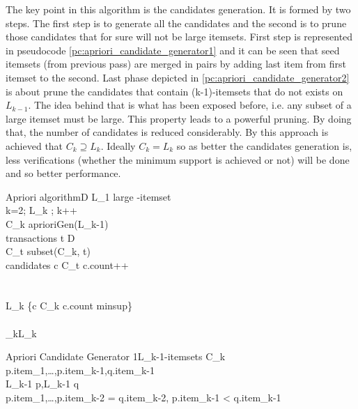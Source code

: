 The key point in this algorithm is the candidates generation. It is formed by
two steps. The first step is to generate all the candidates and the second is to
prune those candidates that for sure will not be large itemsets. First step is
represented in pseudocode \ref{pc:apriori_candidate_generator1} and it can be
seen that seed itemsets (from previous pass) are merged in pairs by adding last
item from first itemset to the second. Last phase depicted in
\ref{pc:apriori_candidate_generator2} is about prune the candidates
that contain (k-1)-itemsets that do not exists on $L_{k-1}$. The idea behind
that is what has been exposed before, i.e. any subset of a large itemset must
be large. This property leads to a powerful pruning. By doing that, the 
number of candidates is reduced considerably. By this approach is achieved 
that $C_{k} \supseteq L_{k}$. Ideally $C_{k} = L_{k}$
so as better the candidates generation is, less verifications (whether the minimum
support is achieved or not) will be done and so better performance.

\begin{pseudocode}{Apriori algorithm}{D}
\label{pc:apriori}
    L_{1} \GETS large -itemset
	\\
    \FOR k=2; L_{k} \neq \emptyset; k++ \DO
	\BEGIN
         \\
        C_{k} \GETS aprioriGen(L_{k-1})\\
        \FORALL transactions \quad t \in D \DO
        \BEGIN
             \\
            C_{t} \GETS subset(C_{k}, t)\\
            \FORALL candidates \quad c \in C_{t} \DO
            \BEGIN
                c.count++\\
            \END\\
        \END\\
        L_{k} \GETS \{c \in C_{k} \mid c.count \geq minsup\}
	\END\\
	\\

    \RETURN \bigcup_{k}L_{k}
\end{pseudocode}

\begin{pseudocode}{Apriori Candidate Generator 1}{L_{k-1}-itemsets}
\label{pc:apriori_candidate_generator1}
 \quad C_{k}\\
 \quad p.item_{1},\ldots,p.item_{k-1},q.item_{k-1}\\
 \quad L_{k-1} \quad p,L_{k-1} \quad q\\
 \quad p.item_{1},\ldots,p.item_{k-2} = q.item_{k-2}, 
p.item_{k-1} < q.item_{k-1}\\
\end{pseudocode}


